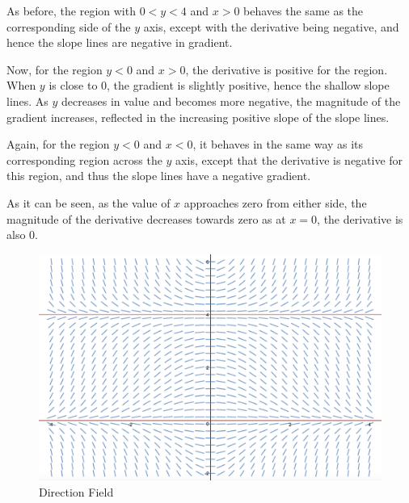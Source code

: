 \documentclass[a4paper]{article}
\begin{document}
\begin{enumerate}[label=\textbf{\arabic*.}]
\begin{enumerate}
		\bigbreak

		As before, the region with $\displaystyle{0<y<4}$ and $\displaystyle{x>0}$ behaves the same as the corresponding side of the $\displaystyle{y}$ axis, except with the derivative being negative, and hence the slope lines are negative in gradient.

		\bigbreak

		Now, for the region $\displaystyle{y < 0}$ and $\displaystyle{x>0}$, the derivative is positive for the region. When $\displaystyle{y}$ is close to 0, the gradient is slightly positive, hence the shallow slope lines. As $\displaystyle{y}$ decreases in value and becomes more negative, the magnitude of the gradient increases, reflected in the increasing positive slope of the slope lines. 

		\bigbreak

		Again, for the region $\displaystyle{y < 0}$ and $\displaystyle{x<0}$, it behaves in the same way as its corresponding region across the $\displaystyle{y}$ axis, except that the derivative is negative for this region, and thus the slope lines have a negative gradient.

		\bigbreak

		As it can be seen, as the value of $\displaystyle{x}$ approaches zero from either side, the magnitude of the derivative decreases towards zero as at $\displaystyle{x=0}$, the derivative is also 0.

		\pagebreak

		\begin{figure}[h!]
		\begin{center}
		\caption{Direction Field}
		\includegraphics[width=\linewidth]{DirectionField1}
		\end{center}
		\end{figure}


\end{enumerate}
\end{enumerate}
\end{document}
